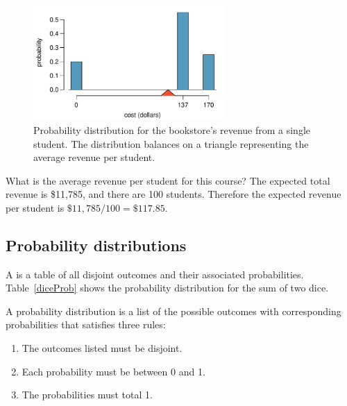 \begin{figure}[hhh]
\centering
\includegraphics[width=0.65\textwidth]{ch_probability/figures/bookCostDist/bookCostDist}
\caption{Probability distribution for the bookstore's revenue from a single student. The distribution balances on a triangle representing the average revenue per student.}
\label{bookCostDist}
\end{figure}

\begin{example}{What is the average revenue per student for this course?}\label{revFromStudent}
The expected total revenue is \$11,785, and there are 100 students. Therefore the expected revenue per student is $\$11,785/100 =  \$117.85$.
\end{example}


\subsection{Probability distributions}


A  is a table of all disjoint outcomes and their associated probabilities. Table~\ref{diceProb} shows the probability distribution for the sum of two dice.

\begin{termBox}{
A probability distribution is a list of the possible outcomes with corresponding probabilities that satisfies three rules: \vspace{-2mm}
\begin{enumerate}
\setlength{\itemsep}{0mm}
\item The outcomes listed must be disjoint.
\item Each probability must be between 0 and 1.
\item The probabilities must total 1. \vspace{1mm}
\end{enumerate}}
\end{termBox}

